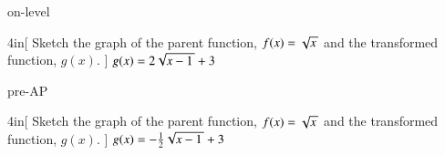 

\begin{taggedblock}{on-level}
    \begin{myProblem}[\normalsize]{4in}[
        Sketch the graph of the parent function, $f(x)=\myRoot{x}$ and the transformed function, $g(x)$.
        ]{
            $g(x) = 2 \myRoot{x-1} + 3$
        }
    \end{myProblem}
\end{taggedblock}

\begin{taggedblock}{pre-AP}
    \begin{myProblem}[\normalsize]{4in}[
        Sketch the graph of the parent function, $f(x)=\myRoot{x}$ and the transformed function, $g(x)$.
        ]{
            $g(x) = -\frac{1}{2} \myRoot{x-1} + 3$
        }
    \end{myProblem}
\end{taggedblock}
